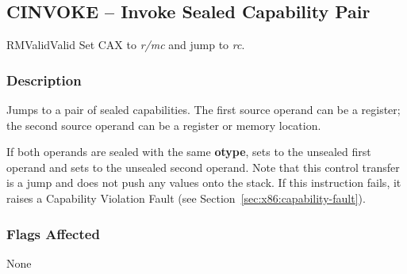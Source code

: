 \clearpage
{}
{}
\subsection*{CINVOKE -- Invoke Sealed Capability Pair}

\begin{x86opcodetable}
  {RM}{Valid}{Valid}
  {Set CAX to \emph{r/mc} and jump to \emph{rc}.}
\end{x86opcodetable}

\begin{x86opentable}
\end{x86opentable}

\subsubsection*{Description}

Jumps to a pair of sealed capabilities.  The first source operand can
be a register; the second source operand can be a register or memory
location.

If both operands are sealed with the same \textbf{otype}, sets \CIP{}
to the unsealed first operand and sets \CAX{} to the unsealed second
operand.  Note that this control transfer is a jump and does not push
any values onto the stack.  If this instruction fails, it raises a
Capability Violation Fault (see
Section~\ref{sec:x86:capability-fault}).

\subsubsection*{Flags Affected}

None
